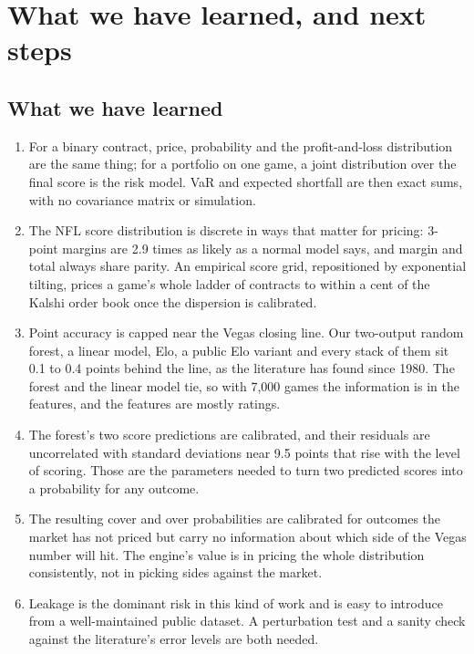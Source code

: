 \documentclass[11pt]{article}
\begin{document}
\section{What we have learned, and next steps}

\subsection{What we have learned}
\begin{enumerate}[nosep]
\item For a binary contract, price, probability and the profit-and-loss distribution are the same thing; for a portfolio on one game, a joint distribution over the final score is the risk model. VaR and expected shortfall are then exact sums, with no covariance matrix or simulation.
\item The NFL score distribution is discrete in ways that matter for pricing: 3-point margins are 2.9 times as likely as a normal model says, and margin and total always share parity. An empirical score grid, repositioned by exponential tilting, prices a game's whole ladder of contracts to within a cent of the Kalshi order book once the dispersion is calibrated.
\item Point accuracy is capped near the Vegas closing line. Our two-output random forest, a linear model, Elo, a public Elo variant and every stack of them sit 0.1 to 0.4 points behind the line, as the literature has found since 1980. The forest and the linear model tie, so with 7,000 games the information is in the features, and the features are mostly ratings.
\item The forest's two score predictions are calibrated, and their residuals are uncorrelated with standard deviations near 9.5 points that rise with the level of scoring. Those are the parameters needed to turn two predicted scores into a probability for any outcome.
\item The resulting cover and over probabilities are calibrated for outcomes the market has not priced but carry no information about which side of the Vegas number will hit. The engine's value is in pricing the whole distribution consistently, not in picking sides against the market.
\item Leakage is the dominant risk in this kind of work and is easy to introduce from a well-maintained public dataset. A perturbation test and a sanity check against the literature's error levels are both needed.
\end{enumerate}
\end{document}
